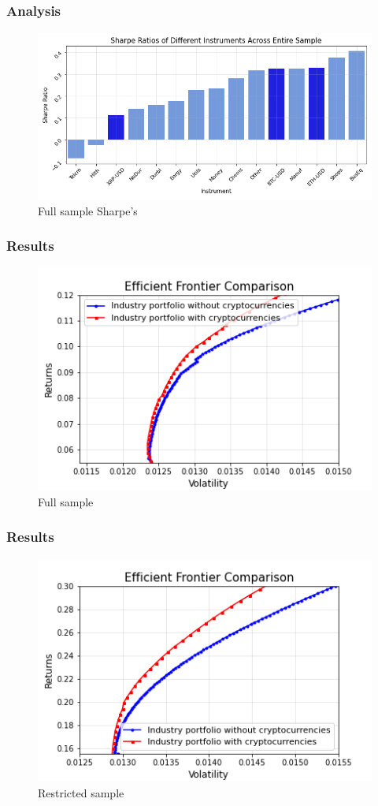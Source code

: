 \documentclass{beamer}
\begin{document}
\begin{frame}
\frametitle{Analysis}
\begin{figure}
    \centering
    \includegraphics[width=0.8\linewidth]{Figures/SR_Entire_Sample.png}
    \caption{Full sample Sharpe's}
    \label{fig:sharpe}
\end{figure}
\end{frame}

\begin{frame}
\frametitle{Results}
\begin{figure}
    \centering
    \includegraphics[width=0.8\linewidth]{Figures/Efficient_Frontier_Comparison_Full_Sample.png}
    \caption{Full sample}
    \label{fig:full}
\end{figure}
\end{frame}

\begin{frame}
\frametitle{Results}
\begin{figure}
    \centering
    \includegraphics[width=0.8\linewidth]{Figures/Efficient_Frontier_Comparison_Bull_Market.png}
    \caption{Restricted sample}
    \label{fig:restricted}
\end{figure}
\end{frame}
\end{document}
